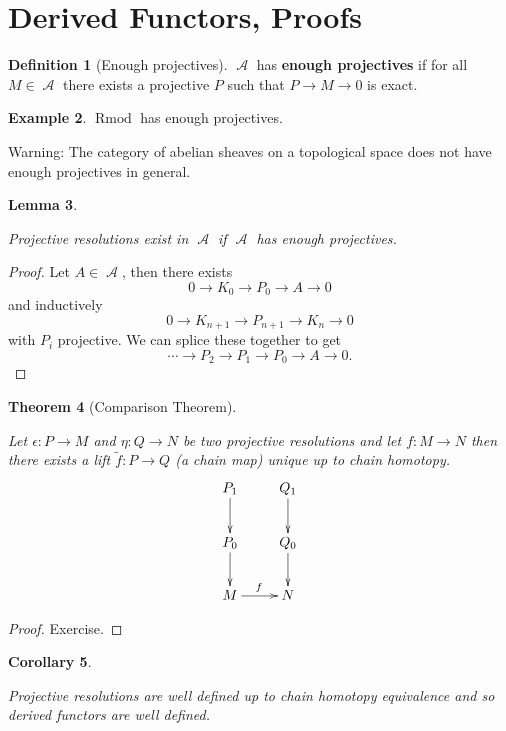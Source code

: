 \documentclass[10pt,]{book}
\newcommand{\terminology}[1]{\textbf{#1}}
\theoremstyle{plain}
\newtheorem{theorem}{Theorem}[section]
\newtheorem{corollary}[theorem]{Corollary}
\newtheorem{lemma}[theorem]{Lemma}
\theoremstyle{definition}
\newtheorem{definition}[theorem]{Definition}
\newtheorem{example}[theorem]{Example}
\numberwithin{equation}{section}
\DeclareMathOperator{\Rmod}{R\text{mod}}
\DeclareMathOperator{\cA}{\mathcal{A}}
\begin{document}
\section[Derived Functors, Proofs]{Derived Functors, Proofs}\label{sec-derived-proofs}
\begin{definition}[Enough projectives]\label{definition-20}
\(\cA\) has \terminology{enough projectives} if for all \(M\in \cA\) there exists a projective \(P\) such that \(P \to M \to 0\) is exact.\end{definition}
\begin{example}\label{example-12}
\(\Rmod\) has enough projectives.
          \end{example}

          Warning: The category of abelian sheaves on a topological space does not have enough projectives in general.
\begin{lemma}\label{lemma-5}

            Projective resolutions exist in \(\cA\) if \(\cA\) has enough projectives.
          \end{lemma}
\begin{proof}

            Let \(A\in \cA\), then there exists
            \[
              0 \to K_0 \to P_0 \to A \to 0
            \]
            and inductively
            \[
              0 \to K_{n+1} \to P_{n+1} \to K_n \to 0
            \]
            with \(P_i\) projective.
            We can splice these together to get 
            \[
              \cdots \to P_2 \to P_1 \to P_0 \to A \to 0.
            \]\end{proof}
\begin{theorem}[Comparison Theorem]\label{theorem-2}

            Let \(\epsilon \colon P \to M\) and \(\eta \colon Q \to N\) be two projective resolutions and let \(f\colon M \to N\) then there exists a lift \(\tilde{f} \colon P \to Q\) (a chain map) unique up to chain homotopy.
            \[
              \xymatrix{
                P_1 \ar[d] & Q_1\ar[d]\\
                P_0 \ar[d] & Q_0\ar[d]\\
                M \ar[r]^{f} & N\\
              }
            \]\end{theorem}
\begin{proof}
Exercise.\end{proof}
\begin{corollary}\label{corollary-2}

            Projective resolutions are well defined up to chain homotopy equivalence and so derived functors are well defined.
          \end{corollary}
\end{document}
